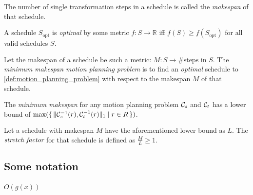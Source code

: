 \begin{definition}\label{def:makespan}
	The number of single transformation steps in a schedule is called the \emph{makespan} of that schedule.
\end{definition}

\begin{definition}\label{def:optimality}
	A schedule $S_\text{opt}$ is \emph{optimal} by some metric $f : S \rightarrow \mathbb{R}$ iff $f(S) \geq f(S_\text{opt})$ for all valid schedules $S$.
\end{definition}


\begin{definition}
	Let the makespan of a schedule be such a metric: $M : S \rightarrow \text{\# steps in } S$.
	The \emph{minimum makespan motion planning problem} is to find an \emph{optimal} schedule to \cref{def:motion_planning_problem} with respect to the makespan $M$ of that schedule.
\end{definition}

\begin{remark}
	The \emph{minimum makespan} for any motion planning problem $\mathcal{C}_{s}$ and $\mathcal{C}_{t}$ has a lower bound of $\max(\set{\lVert\mathcal{C}_{s}^{-1}(r), \mathcal{C}_{t}^{-1}(r)\rVert_1 \mid r \in R})$.
\end{remark}

\begin{definition}
	Let a schedule with makespan $M$ have the aforementioned lower bound as $L$.
	The $\emph{stretch factor}$ for that schedule is defined as $\frac{M}{L} \geq 1$.
\end{definition}

\subsection{Some notation}

\begin{definition}
	$O(g(x))$
\end{definition}






